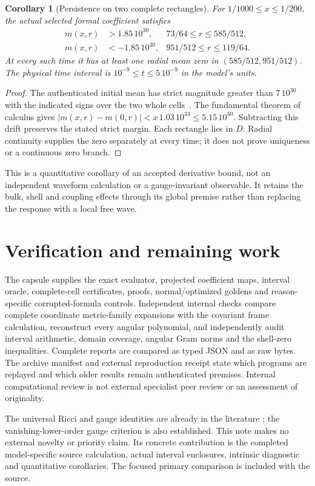 \documentclass[11pt]{article}
\newtheorem{corollary}{Corollary}
\begin{document}
\begin{corollary}[Persistence on two complete rectangles]
For $1/1000\le x\le1/200$, the actual selected formal coefficient satisfies
\begin{align}
 m(x,r)&>1.85\,10^{30},&73/64\le r\le585/512,\\
 m(x,r)&<-1.85\,10^{30},&951/512\le r\le119/64.
\end{align}
At every such time it has at least one radial mean zero in
$(585/512,951/512)$. The physical time interval is
$10^{-9}\le t\le5\,10^{-9}$ in the model's units.
\end{corollary}
\begin{proof}
The authenticated initial mean has strict magnitude greater than
$7\,10^{30}$ with the indicated signs over the two whole cells~\cite{parent}.
The fundamental theorem of calculus gives
$|m(x,r)-m(0,r)|<x\,1.03\,10^{33}\le5.15\,10^{30}$.
Subtracting this drift preserves the stated strict margin. Each rectangle
lies in $D$. Radial continuity supplies the zero separately at every time;
it does not prove uniqueness or a continuous zero branch.
\end{proof}

This is a quantitative corollary of an accepted derivative bound, not an
independent waveform calculation or a gauge-invariant observable. It retains
the bulk, shell and coupling effects through its global premise rather than
replacing the response with a local free wave.

\section{Verification and remaining work}

The capsule supplies the exact evaluator, projected coefficient maps,
interval oracle, complete-cell certificates, proofs, normal/optimized
goldens and reason-specific corrupted-formula controls. Independent internal
checks compare complete coordinate metric-family expansions with the
covariant frame calculation, reconstruct every angular polynomial, and
independently audit interval arithmetic, domain coverage, angular Gram
norms and the shell-zero inequalities. Complete reports are compared as
typed JSON and as raw bytes. The archive manifest and external reproduction
receipt state which programs are replayed and which older results remain
authenticated premises. Internal computational review is not external
specialist peer review or an assessment of originality.

The universal Ricci and gauge identities are already in the literature
\cite{bmm2006,bmm2007,xpert}; the vanishing-lower-order gauge criterion is
also established. This note makes no external novelty or priority claim.
Its concrete contribution is the completed model-specific source calculation,
actual interval enclosures, intrinsic diagnostic and quantitative corollaries.
The focused primary comparison is included with the source.
\end{document}
